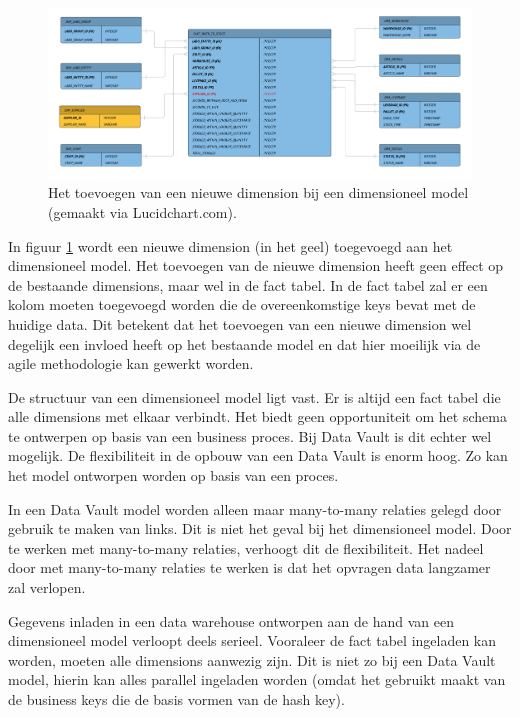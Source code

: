 \begin{figure}[h]
	\centering
	\includegraphics[scale=0.45]{../images/changedm.png}
	\caption{Het toevoegen van een nieuwe dimension bij een dimensioneel model (gemaakt via Lucidchart.com).}
	\label{fig:changedm}
\end{figure}

In figuur \ref{fig:changedm} wordt een nieuwe dimension (in het geel) toegevoegd aan het dimensioneel model. Het toevoegen van de nieuwe dimension heeft geen effect op de bestaande dimensions, maar wel in de fact tabel. In de fact tabel zal er een kolom moeten toegevoegd worden die de overeenkomstige keys bevat met de huidige data. Dit betekent dat het toevoegen van een nieuwe dimension wel degelijk een invloed heeft op het bestaande model en dat hier moeilijk via de agile methodologie kan gewerkt worden.

De structuur van een dimensioneel model ligt vast. Er is altijd een fact tabel die alle dimensions met elkaar verbindt. Het biedt geen opportuniteit om het schema te ontwerpen op basis van een business proces. Bij Data Vault is dit echter wel mogelijk. De flexibiliteit in de opbouw van een Data Vault is enorm hoog. Zo kan het model ontworpen worden op basis van een proces.

In een Data Vault model worden alleen maar many-to-many relaties gelegd door gebruik te maken van links. Dit is niet het geval bij het dimensioneel model. Door te werken met many-to-many relaties, verhoogt dit de flexibiliteit. Het nadeel door met many-to-many relaties te werken is dat het opvragen data langzamer zal verlopen.

Gegevens inladen in een data warehouse ontworpen aan de hand van een dimensioneel model verloopt deels serieel. Vooraleer de fact tabel ingeladen kan worden, moeten alle dimensions aanwezig zijn. Dit is niet zo bij een Data Vault model, hierin kan alles parallel ingeladen worden (omdat het gebruikt maakt van de business keys die de basis vormen van de hash key).

